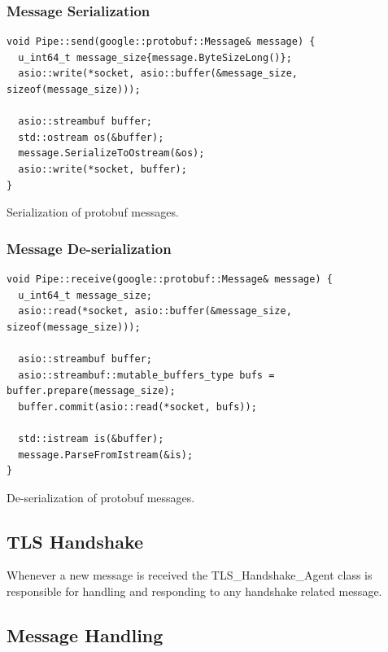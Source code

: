 \documentclass[12pt, letterpaper]{article}
\newenvironment{code}{\captionsetup{type=listing}}{}
\begin{document}
\subsubsection{Message Serialization}
\begin{code}
	\begin{verbatim}
void Pipe::send(google::protobuf::Message& message) {
  u_int64_t message_size{message.ByteSizeLong()};
  asio::write(*socket, asio::buffer(&message_size, sizeof(message_size)));
	
  asio::streambuf buffer;
  std::ostream os(&buffer);
  message.SerializeToOstream(&os);
  asio::write(*socket, buffer);
}
	\end{verbatim}
	\caption{Serialization of protobuf messages.}
	\label{pipeSend}
\end{code}

\subsubsection{Message De-serialization}
\begin{code}
	\begin{verbatim}
void Pipe::receive(google::protobuf::Message& message) {
  u_int64_t message_size;
  asio::read(*socket, asio::buffer(&message_size, sizeof(message_size)));
	
  asio::streambuf buffer;
  asio::streambuf::mutable_buffers_type bufs = buffer.prepare(message_size);
  buffer.commit(asio::read(*socket, bufs));
	
  std::istream is(&buffer);
  message.ParseFromIstream(&is);
}
	\end{verbatim}
	\caption{De-serialization of protobuf messages.}
	\label{pipeReceive}
\end{code}



\subsection{TLS Handshake}
Whenever a new message is received the TLS\_Handshake\_Agent class is responsible for handling and responding to any handshake related message.

\subsection{Message Handling}
\end{document}

